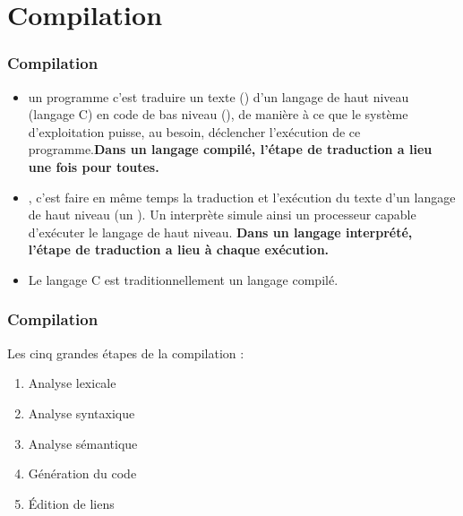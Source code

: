 \documentclass[xcolor=pdftex,svgnames,table]{beamer}
\begin{document}


\section{Compilation}
\begin{frame}
  \frametitle{Compilation\nowrite}
\begin{itemize}
\item  {} un programme c'est traduire un texte () d'un langage de haut niveau (langage C) en code de bas
  niveau (), de manière à ce que le système
  d'exploitation puisse, au besoin, déclencher l'exécution de ce
  programme.\pause \textbf{Dans un langage compilé, l'étape de traduction a
    lieu une fois pour toutes.}\pause

\item {}, c'est faire en même temps la traduction et l'exécution du
texte d'un langage de haut niveau (un ). Un interprète simule ainsi un
processeur capable d'exécuter le langage de haut niveau. \pause
\textbf{Dans un
langage interprété, l'étape de traduction a lieu à chaque exécution.}\pause
\item Le langage C est traditionnellement un langage compilé.
\end{itemize}
\end{frame}

\begin{frame}
  \frametitle{Compilation\nowrite}

Les cinq grandes étapes de la compilation :

  \begin{enumerate}
  \item Analyse lexicale
  \item Analyse syntaxique
  \item Analyse sémantique
  \item Génération du code
  \item Édition de liens
\end{enumerate}
\end{frame}
\end{document}
